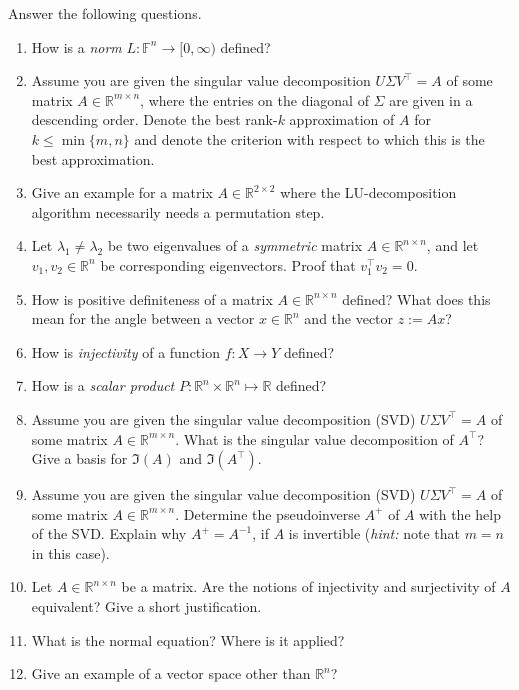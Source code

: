 
Answer the following questions.
\begin{enumerate}
	\item How is a \textit{norm} $L: \mathbb{F}^n \to [0, \infty)$ defined?
	\item Assume you are given the singular value decomposition 
	$U \Sigma V^\top = A$ of some matrix $A \in \mathbb{R}^{m \times n}$, where the 
	entries on the diagonal of $\Sigma$ are given in a descending order.
	Denote the best rank-$k$ approximation of $A$ for $k \leq \min\{m,n\}$ and denote the criterion with respect to which this is the best approximation.
	\item Give an example for a matrix $A \in \mathbb{R}^{2 \times 2}$ where the LU-decomposition algorithm
	necessarily needs a permutation step.
	\item Let $\lambda_1 \neq \lambda_2$ be two eigenvalues of a \textit{symmetric} matrix $A \in \mathbb{R}^{n \times n}$, and let 
	$v_1, v_2 \in \mathbb{R}^n$ be corresponding eigenvectors. Proof that $v_1^\top v_2 = 0$.
	\item How is positive definiteness of a matrix $A\in \mathbb{R}^{n \times n}$ defined? What does this mean for the angle
	between a vector $x \in \mathbb{R}^{n}$ and the vector $z := Ax$?
	\item How is \textit{injectivity} of a function $f\colon X \to Y$ defined?
	\item How is a \textit{scalar product} $P\colon \mathbb{R}^n \times \mathbb{R}^n \mapsto \mathbb{R}$ defined?
	\item Assume you are given the singular value decomposition (SVD) $U \Sigma V^\top = A$ of some matrix $A \in \mathbb{R}^{m \times n}$. What is the singular value decomposition of $A^\top$? Give a basis for $\Im(A)$ and $\Im(A^\top)$.
	\item Assume you are given the singular value decomposition (SVD)
	$U \Sigma V^\top = A$ of some matrix $A \in \mathbb{R}^{m \times n}$. Determine the pseudoinverse $A^+$ of $A$ with the help of the SVD. Explain why $A^+ = A^{-1}$, if $A$ is invertible (\textit{hint:} note that $m=n$ in this case).
	\item Let $A \in \mathbb{R}^{n \times n}$ be a matrix. Are the notions of
	injectivity and surjectivity of $A$ equivalent? Give a short justification.
	\item What is the normal equation? Where is it applied?
	\item Give an example of a vector space other than $\mathbb{R}^n$? 

\end{enumerate}
